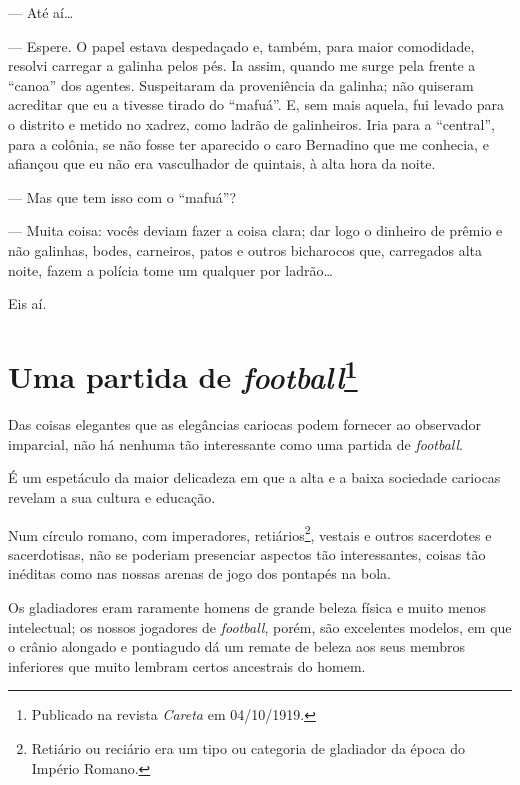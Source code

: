 --- Até aí\ldots{}

--- Espere. O papel estava despedaçado e, também, para maior comodidade,
resolvi carregar a galinha pelos pés. Ia assim, quando me surge pela
frente a ``canoa'' dos agentes. Suspeitaram da proveniência da galinha;
não quiseram acreditar que eu a tivesse tirado do ``mafuá''. E, sem mais
aquela, fui levado para o distrito e metido no xadrez, como ladrão de
galinheiros. Iria para a ``central'', para a colônia, se não fosse ter
aparecido o caro Bernadino que me conhecia, e afiançou que eu não era
vasculhador de quintais, à alta hora da noite.

--- Mas que tem isso com o ``mafuá''?

--- Muita coisa: vocês deviam fazer a coisa clara; dar logo o dinheiro de
prêmio e não galinhas, bodes, carneiros, patos e outros bicharocos que,
carregados alta noite, fazem a polícia tome um qualquer por ladrão\ldots{}

Eis aí.



\chapter[Uma partida de \emph{football}]{Uma partida de \emph{football}\footnote[*]{Publicado na revista \emph{Careta} em 04/10/1919.}}

Das coisas elegantes que as elegâncias cariocas podem fornecer ao
observador imparcial, não há nenhuma tão interessante como uma partida
de \emph{football}.

É um espetáculo da maior delicadeza em que a alta e a baixa sociedade
cariocas revelam a sua cultura e educação.

Num círculo romano, com imperadores, retiários\footnote{Retiário ou
  reciário era um tipo ou categoria de gladiador da época do Império
  Romano.}, vestais e outros sacerdotes e sacerdotisas, não se poderiam
presenciar aspectos tão interessantes, coisas tão inéditas como nas
nossas arenas de jogo dos pontapés na bola.

Os gladiadores eram raramente homens de grande beleza física e muito
menos intelectual; os nossos jogadores de \emph{football}, porém, são
excelentes modelos, em que o crânio alongado e pontiagudo dá um remate
de beleza aos seus membros inferiores que muito lembram certos
ancestrais do homem.

